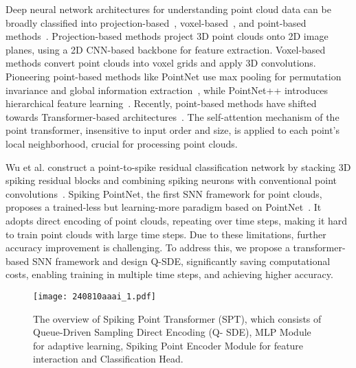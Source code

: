 Deep neural network architectures for understanding point cloud data can be broadly classified into projection-based~\cite{lang2019pointpillars,chen2017multi}, voxel-based~\cite{song2017semantic}, and point-based methods~\cite{marethinking,zhao2019pointweb}. Projection-based methods project 3D point clouds onto 2D image planes, using a 2D CNN-based backbone for feature extraction. Voxel-based methods convert point clouds into voxel grids and apply 3D convolutions. Pioneering point-based methods like PointNet use max pooling for permutation invariance and global information extraction~\cite{qi2017pointnet}, while PointNet++ introduces hierarchical feature learning~\cite{qi2017pointnet++}. Recently, point-based methods have shifted towards Transformer-based architectures~\cite{zhao2021point,park2022fast,wu2022point,wu2024point}. The self-attention mechanism of the point transformer, insensitive to input order and size, is applied to each point's local neighborhood, crucial for processing point clouds.

Wu et al. construct a point-to-spike residual classification network by stacking 3D spiking residual blocks and combining spiking neurons with conventional point convolutions~\cite{wu2024pointsnn}. Spiking PointNet, the first SNN framework for point clouds, proposes a trained-less but learning-more paradigm based on PointNet~\cite{ren2024spiking}. It adopts direct encoding of point clouds, repeating over time steps, making it hard to train point clouds with large time steps. Due to these limitations, further accuracy improvement is challenging. To address this, we propose a transformer-based SNN framework and design Q-SDE, significantly saving computational costs, enabling training in multiple time steps, and achieving higher accuracy.



\begin{figure*}[t]
    \centering
    \texttt{[image: 240810aaai\_1.pdf]}
    \caption{The overview of Spiking Point Transformer (SPT), which consists of Queue-Driven Sampling Direct Encoding (Q-
    SDE), MLP Module for adaptive learning, Spiking Point Encoder Module for feature interaction and Classification Head.}
    \label{fig:1}
\end{figure*}